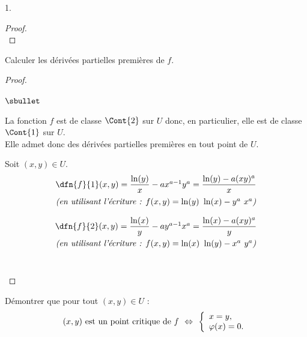 \documentclass[11pt]{article}%
\begin{document}
\begin{noliste}{1.}
\begin{proof}
    ~\\[-1.4cm]
  \end{proof}
  
\item Calculer les dérivées partielles premières de $f$.
  
  \begin{proof}~
    \begin{noliste}{$\sbullet$}
    \item La fonction $f$ est de classe $\Cont{2}$ sur $U$ donc, en
      particulier, elle est de classe $\Cont{1}$ sur $U$.\\
      Elle admet donc des dérivées partielles premières en tout point
      de $U$.
    \item Soit $(x,y)\in U$.
      \[
      \begin{array}{c}
        \dfn{f}{1}(x,y) = 
        \dfrac{\ln(y)}{x}-ax^{a-1}y^a=\dfrac{\ln(y)-a(xy)^a}{x}
        \\[.3cm]
        \text{\it (en utilisant l'écriture : $f(x, y) = \ln(y) \ \ln(x) -
          y^a \ x^a$)} 
        \\[.4cm]
        \dfn{f}{2}(x,y) = 
        \dfrac{\ln(x)}{y}-ay^{a-1}x^a=\dfrac{\ln(x)-a(xy)^a}{y}
        \\[.3cm]
        \text{\it (en utilisant l'écriture : $f(x, y) = \ln(x) \ \ln(y) -
          x^a \ y^a$)} 
      \end{array}
      \]
      ~\\[-1.2cm]
    \end{noliste}
  \end{proof}
  
  
  
   
\item Démontrer que pour tout $(x,y)\in U$ :
  \[
  \mbox{$(x,y)$ est un point critique de $f$ \ $\Leftrightarrow$ \
    $\left\{ \begin{array}{l}
        x=y,\\
        \varphi(x)=0.
      \end{array}\right.$}
  \]
  

\end{noliste}
\end{document}
